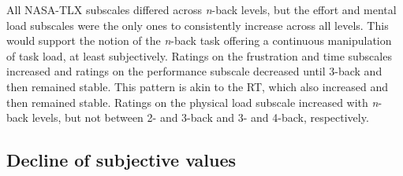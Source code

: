\documentclass[
  man,floatsintext]{apa6}
\begin{document}
All NASA-TLX subscales differed across \emph{n}-back levels, but the effort and mental load subscales were the only ones to consistently increase across all levels.
This would support the notion of the \emph{n}-back task offering a continuous manipulation of task load, at least subjectively.
Ratings on the frustration and time subscales increased and ratings on the performance subscale decreased until 3-back and then remained stable.
This pattern is akin to the RT, which also increased and then remained stable.
Ratings on the physical load subscale increased with \emph{n}-back levels, but not between 2- and 3-back and 3- and 4-back, respectively.

\hypertarget{decline-of-subjective-values-1}{%
\subsection{Decline of subjective values}\label{decline-of-subjective-values-1}}
\end{document}
